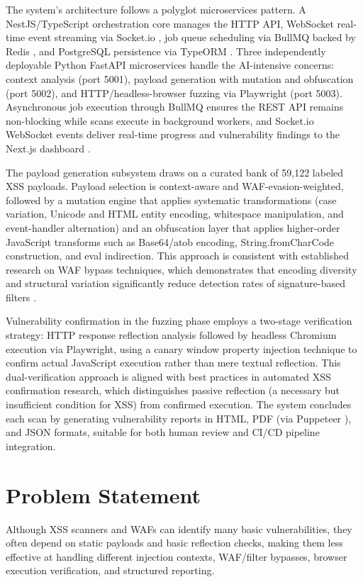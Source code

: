 The system's architecture follows a polyglot microservices pattern. A NestJS/TypeScript orchestration core \cite{nestjs} manages the HTTP API, WebSocket real-time event streaming via Socket.io \cite{socketio}, job queue scheduling via BullMQ backed by Redis \cite{bullmq}, and PostgreSQL persistence via TypeORM \cite{typeorm}. Three independently deployable Python FastAPI microservices \cite{fastapi} handle the AI-intensive concerns: context analysis (port 5001), payload generation with mutation and obfuscation (port 5002), and HTTP/headless-browser fuzzing via Playwright \cite{playwright} (port 5003). Asynchronous job execution through BullMQ ensures the REST API remains non-blocking while scans execute in background workers, and Socket.io WebSocket events deliver real-time progress and vulnerability findings to the Next.js dashboard \cite{nextjs}.

The payload generation subsystem draws on a curated bank of 59,122 labeled XSS payloads. Payload selection is context-aware and WAF-evasion-weighted, followed by a mutation engine that applies systematic transformations (case variation, Unicode and HTML entity encoding, whitespace manipulation, and event-handler alternation) and an obfuscation layer that applies higher-order JavaScript transforms such as Base64/atob encoding, String.fromCharCode construction, and eval indirection. This approach is consistent with established research on WAF bypass techniques, which demonstrates that encoding diversity and structural variation significantly reduce detection rates of signature-based filters \cite{bau2010state}.

Vulnerability confirmation in the fuzzing phase employs a two-stage verification strategy: HTTP response reflection analysis followed by headless Chromium execution via Playwright, using a canary window property injection technique to confirm actual JavaScript execution rather than mere textual reflection. This dual-verification approach is aligned with best practices in automated XSS confirmation research, which distinguishes passive reflection (a necessary but insufficient condition for XSS) from confirmed execution. The system concludes each scan by generating vulnerability reports in HTML, PDF (via Puppeteer \cite{puppeteer}), and JSON formats, suitable for both human review and CI/CD pipeline integration.

\section{ Problem Statement}
Although XSS scanners and WAFs can identify many basic vulnerabilities, they often depend on static payloads and basic reflection checks, making them less effective at handling different injection contexts, WAF/filter bypasses, browser execution verification, and structured reporting.

